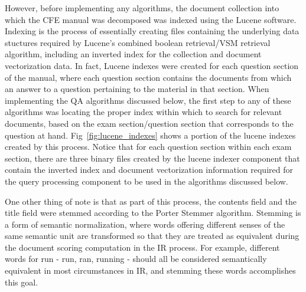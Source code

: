 However, before implementing any algorithms, the document collection into which the CFE manual was decomposed was indexed using the Lucene software.  Indexing is the process of essentially creating files containing the underlying data stuctures required by Lucene's combined boolean retrieval/VSM retrieval algorithm, including an inverted index for the collection and document vectorization data.  In fact, Lucene indexes were created for each question section of the manual, where each question section contains the documents from which an answer to a question pertaining to the material in that section.  When implementing the QA algorithms discussed below, the first step to any of these algorithms was locating the proper index within which to search for relevant documents, based on the exam section/question section that corresponds to the question at hand.  Fig~\ref{fig:lucene_indexes} shows a portion of the lucene indexes created by this process.  Notice that for each question section within each exam section, there are three binary files created by the lucene indexer component that contain the inverted index and document vectorization information required for the query processing component to be used in the algorithms discussed below.

One other thing of note is that as part of this process, the contents field and the title field were stemmed according to the Porter Stemmer algorithm.  Stemming is a form of semantic normalization, where words offering different senses of the same semantic unit are transformed so that they are treated as equivalent during the document scoring computation in the IR process.  For example, different words for run - run, ran, running - should all be considered semantically equivalent in most circumstances in IR, and stemming these words accomplishes this goal.

